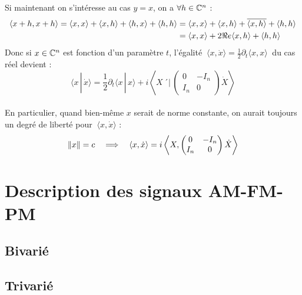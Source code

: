 Si maintenant on s'intéresse au cas $y=x$, on a $\forall h\in\mathbb{C}^n$ :
\begin{align*}
\langle x+h, x+h \rangle = \langle x, x \rangle + \langle x, h \rangle + \langle h, x \rangle + \langle h, h \rangle 
&= \langle x, x \rangle + \langle x, h \rangle  + \overline{\langle x, h \rangle }+ \langle h, h \rangle \\
&= \langle x, x \rangle + 2\Re e \langle x, h \rangle + \langle h, h \rangle
\end{align*}
Donc si $x\in\mathbb{C}^n$ est fonction d'un paramètre $t$, l'égalité $\ \langle x, \dot{x} \rangle = \frac{1}{2}\partial_t\langle x, x \rangle\ $ du cas réel devient :
\begin{equation}\label{eq:x_scal_dotx}
\langle x\,|\, \dot{x} \rangle = \frac{1}{2}\partial_t\langle x\,|\, x \rangle + i\left\langle X\,´\Big|\,\begin{pmatrix} 0 & -I_n \\ I_n & 0 \end{pmatrix}\dot{X}\right\rangle
\end{equation}
\\
En particulier, quand bien-même $x$ serait de norme constante, on aurait toujours un degré de liberté pour $\ \langle x, \dot{x} \rangle$ :
\[\|x\|=c\quad \Longrightarrow\quad \langle x, \dot{x} \rangle = i\left\langle X,\begin{pmatrix} 0 & -I_n \\ I_n & 0 \end{pmatrix}\dot{X}\right\rangle\]




\section{Description des signaux AM-FM-PM}\label{sec:bases}

\subsection{Bivarié}





\subsection{Trivarié}


